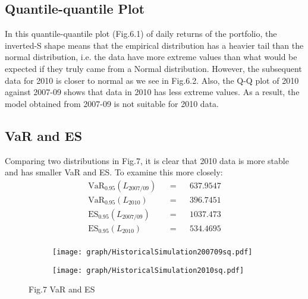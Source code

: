 \documentclass[11pt]{article}
\begin{document}
\vspace{-1em}\subsection{Quantile-quantile Plot}\vspace{-1em} 
In this quantile-quantile plot (Fig.6.1) of daily returns of the portfolio, the inverted-S shape means that the empirical distribution has a heavier tail than the normal distribution, i.e. the data have more extreme values than what would be expected if they truly came from a Normal distribution. However, the subsequent data for 2010 is closer to normal as we see in Fig.6.2. Also, the Q-Q plot of 2010 against 2007-09 shows that data in 2010 has less extreme values. As a result, the model obtained from 2007-09 is not suitable for 2010 data.

\vspace{-1em}\subsection{VaR and ES}\vspace{-1em}
Comparing two distributions in Fig.7, it is clear that 2010 data is more stable and has smaller VaR and ES. To examine this more closely:
\begin{align*} 
  &\text{VaR}_{0.95}(L_{2007/09})& &=& &637.9547& \\
  &\text{VaR}_{0.95}(L_{2010})& &=& &396.7451& \\
  &\text{ES}_{0.95}(L_{2007/09})& &=& &1037.473& \\
  &\text{ES}_{0.95}(L_{2010})& &=& &534.4695& \\
\end{align*}
\vspace{-2.5em}
\begin{figure}[h]
\begin{subfigure}{0.5\textwidth}
  \centering
  \texttt{[image: graph/HistoricalSimulation200709sq.pdf]}
\end{subfigure}%
\begin{subfigure}{0.5\textwidth}
  \centering
  \texttt{[image: graph/HistoricalSimulation2010sq.pdf]}
\end{subfigure}
\centering Fig.7 VaR and ES
\end{figure}
\end{document}
